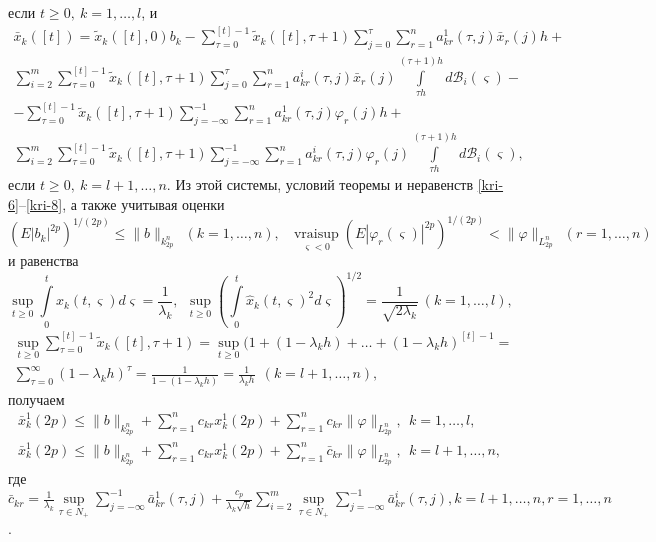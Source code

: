 если $t\geq 0, \ k= 1,\dots,l$, и
$$
\begin{array}{crl}
\bar x_k([t]) = \tilde x_k([t],0)b_k - \sum \limits _{\tau=0
}^{[t]-1}\tilde x_k([t],\tau + 1)\sum \limits _{j=0 }^{\tau}\sum
\limits _{r=1 }^n
a^{1}_{kr}(\tau,j)\bar x_r(j)h + \\
\sum \limits _{i=2}^{m}\sum \limits _{\tau=0 }^{[t]-1}\tilde
x_k([t],\tau + 1)\sum \limits _{j=0 }^{\tau} \sum \limits _{r=1 }^n
a^{i}_{kr}(\tau,j) \bar x_r(j)\int \limits _{\tau h}^{(\tau
+1)h} d\mathcal B_i(\varsigma) -
\\ -
\sum \limits _{\tau=0
}^{[t]-1}\tilde x_k([t],\tau + 1)\sum \limits _{j=- \infty
}^{-1}\sum \limits _{r=1 }^n
a^{1}_{kr}(\tau,j)\varphi _r(j)h +\\
 \sum \limits _{i=2}^{m}\sum
\limits _{\tau=0 }^{[t]-1}\tilde x_k([t],\tau + 1)\sum \limits
_{j=-\infty }^{-1} \sum \limits _{r=1 }^n a^{i}_{kr}(\tau,j)\varphi
_r(j) \int \limits _{\tau h}^{(\tau +1)h}d\mathcal B_i(\varsigma ),
\end{array}
$$
если $t\geq 0, \ k = l+1, \dots,n.$
Из этой системы, условий теоремы и неравенств \eqref{kri-6}--\eqref{kri-8}, а также
учитывая оценки $$(E|b_k|^{2p})^{1/(2p)} \leq \|b\|_{k^n_{2p}} \ \
(k=1,\dots,n), \ \ \ \mathrel {\mathop {v r a i \sup} \limits _{\varsigma
< 0}}(E|\varphi _r(\varsigma )|^{2p})^{1/(2p)} < \|\varphi
\|_{L_{2p}^n} \ \ (r=1,\dots,n)$$  и равенства
$$\mathrel {\mathop {\sup} \limits _{t\geq 0}}\int \limits _0^t\hat
x_k(t,\varsigma)d\varsigma = \frac{1}{\lambda _k}, \ \ \mathrel
{\mathop {\sup} \limits _{t\geq 0}} \left(\int \limits _0^t\hat
x_k(t,\varsigma)^2d\varsigma \right)^{1/2} =
\frac{1}{\sqrt{2\lambda _k}} \  (k = 1, \dots ,l),$$
$$
\begin{array}{c}
\mathrel {\mathop {\sup} \limits _{t\geq 0}}\sum \limits _{\tau=0
}^{[t]-1}\tilde x_k([t],\tau + 1) =  \mathrel {\mathop {\sup}
\limits _{t\geq 0}}(1
+ (1-\lambda _kh)+ \dots + (1-\lambda _kh)^{[t]-1} = \\
 \sum \limits
_{\tau=0 }^{\infty } (1-\lambda_kh)^\tau =
\frac{1}{1-(1-\lambda_kh)}= \frac{1}{\lambda _kh} \ \ (k = l+1,
\dots,n),
\end{array}
 $$
получаем
$$
\begin{array}{crl}
\bar x^1_k(2p) \leq \|b\|_{k^n_{2p}} + \sum \limits
_{r=1}^{n}c_{kr}x^1_k(2p) +
\sum \limits_{r=1}^{n}c_{kr} \|\varphi \|_{L_{2p}^n}, \ \ k = 1, \dots ,l,\\
\bar x^1_k(2p) \leq \|b\|_{k^n_{2p}} + \sum
\limits_{r=1}^{n}c_{kr}x^1_k(2p) + \sum \limits_{r=1}^{n}\bar
c_{kr}\|\varphi  \|_{L_{2p}^n}, \ \ k = l + 1, \dots ,n,
\end{array}
$$
где $\bar c_{kr} = \frac{1}{\lambda _k}\mathrel {\mathop {\sup}
\limits _{\tau \in N_+ }} \sum \limits _{j=-\infty }^{-1}\bar
a^{1}_{kr}(\tau,j) + \frac{c_p}{\lambda _k\sqrt{h}} \sum \limits
_{i=2}^{m}\mathrel {\mathop {\sup}  \limits _{\tau \in N_+}} \sum
\limits _{j=-\infty }^{-1} \bar a^{i}_{kr}(\tau,j), k = l+1, \dots,n,
r = 1, \dots, n$.

